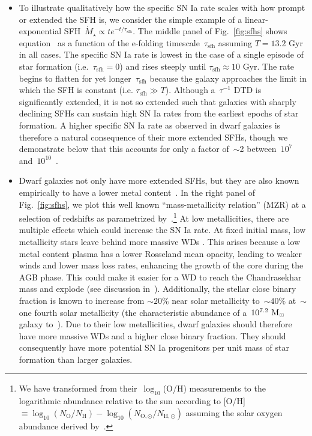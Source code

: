 \documentclass[ms.tex]{subfiles}
\begin{document}
\begin{itemize}
	\item To illustrate qualitatively how the specific SN Ia rate scales with
	how prompt or extended the SFH is, we consider the simple example of a
	linear-exponential SFH~$\dot{M}_\star \propto te^{-t / \tau_\text{sfh}}$.
	The middle panel of Fig.~\ref{fig:sfhs} shows equation~
	as a function of the e-folding timescale~$\tau_\text{sfh}$ assuming
	$T = 13.2$ Gyr in all cases.
	The specific SN Ia rate is lowest in the case of a single episode of star
	formation (i.e.~$\tau_\text{sfh} = 0$) and rises steeply until
	$\tau_\text{sfh} \approx 10$ Gyr.
	The rate begins to flatten for yet longer~$\tau_\text{sfh}$ because the
	galaxy approaches the limit in which the SFH is constant (i.e.
	$\tau_\text{sfh} \gg T$).
	Although a~$\tau^{-1}$ DTD is significantly extended, it is not so extended
	such that galaxies with sharply declining SFHs can sustain high SN Ia rates
	from the earliest epochs of star formation.
	A higher specific SN Ia rate as observed in dwarf galaxies is therefore a
	natural consequence of their more extended SFHs, though we demonstrate
	below that this accounts for only a factor of~$\sim$2 between~$10^7$
	and~$10^{10}$~\msun.

	\item Dwarf galaxies not only have more extended SFHs, but they are also
	known empirically to have a lower metal content~\citep{Tremonti2004}.
	In the right panel of Fig.~\ref{fig:sfhs}, we plot this well known
	``mass-metallicity relation'' (MZR) at a selection of redshifts as
	parametrized by~\citet[][see their equation 5]{Zahid2014}.\footnote{
		We have transformed from their~$\log_{10}$(O/H) measurements to the
		logarithmic abundance relative to the sun according to [O/H]~$\equiv
		\log_{10}(N_\text{O} / N_\text{H}) - \log_{10}(N_{\text{O},\odot} /
		N_{\text{H},\odot})$ assuming the solar oxygen abundance derived
		by~\citet{Asplund2009}.
	}
	At low metallicities, there are multiple effects which could increase the
	SN Ia rate.
	At fixed initial mass, low metallicity stars leave behind more massive WDs
	\citep{Umeda1999, Willson2000, Marigo2007, Meng2008, Zhao2012, Kalirai2014}.
	This arises because a low metal content plasma has a lower Rosseland mean
	opacity, leading to weaker winds and lower mass loss rates, enhancing the
	growth of the core during the AGB phase.
	This could make it easier for a WD to reach the Chandrasekhar mass and
	explode (see discussion in~\citealt{Kistler2013}).
	Additionally, the stellar close binary fraction is known to increase from
	$\sim20$\% near solar metallicity to~$\sim40$\% at~$\sim$one fourth solar
	metallicity (the characteristic abundance of a~$10^{7.2}~\text{M}_\odot$ galaxy
	to~\citealt{Zahid2014}).
	Due to their low metallicities, dwarf galaxies should therefore have more
	massive WDs and a higher close binary fraction.
	They should consequently have more potential SN Ia progenitors per unit
	mass of star formation than larger galaxies.


\end{itemize}
\end{document}
